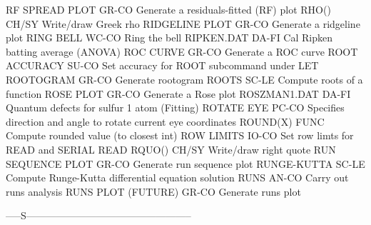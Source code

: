 RF SPREAD PLOT              GR-CO Generate a residuals-fitted (RF)  plot
RHO()                       CH/SY Write/draw Greek rho
RIDGELINE PLOT              GR-CO Generate a ridgeline plot
RING BELL                   WC-CO Ring the bell
RIPKEN.DAT                  DA-FI Cal Ripken batting average (ANOVA)
ROC CURVE                   GR-CO Generate a ROC curve
ROOT ACCURACY               SU-CO Set accuracy for ROOT subcommand under LET
ROOTOGRAM                   GR-CO Generate rootogram
ROOTS                       SC-LE Compute roots of a function
ROSE PLOT                   GR-CO Generate a Rose plot
ROSZMAN1.DAT                DA-FI Quantum defects for sulfur 1 atom (Fitting)
ROTATE EYE                  PC-CO Specifies direction and angle to rotate current eye coordinates
ROUND(X)                    FUNC  Compute rounded value (to closest int)
ROW LIMITS                  IO-CO Set row limts for READ and SERIAL READ
RQUO()                      CH/SY Write/draw right quote
RUN SEQUENCE PLOT           GR-CO Generate run sequence plot
RUNGE-KUTTA                 SC-LE Compute Runge-Kutta differential equation solution
RUNS                        AN-CO Carry out runs analysis
RUNS PLOT (FUTURE)          GR-CO Generate runs plot

-----S--------------------------------------------------

